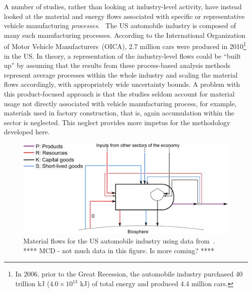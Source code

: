 A number of studies,
rather than looking at industry-level activity,
have instead looked at 
the material and energy flows 
associated with specific or representative vehicle 
manufacturing \emph{processes}.~\cite{Sullivan1998, McCleese2002, Sullivan2010, Hawkins2012, MacLean1998, MacLean2003, Schweimer2000, Burnham2006}
The US automobile industry is composed
of many such manufacturing processes.
According to the International Organization of 
Motor Vehicle Manufacturers~(OICA), 
2.7 million cars were produced in 2010\footnote{In 2006, 
prior to the Great Recession, 
the automobile industry purchased 
40 trillion kJ ($4.0 \times 10^{13}$ kJ) of total energy and 
produced 4.4 million cars.
} 
in the US.\cite{Motor-Vehicle-Manufacturers-OICA:2014aa}
In theory,
a representation of the industry-level flows
could be ``built up'' by assuming that the results from
these process-based analysis methods represent average
processes within the whole industry and 
scaling the material flows accordingly,
with appropriately wide uncertainty bounds.
A problem with this product-focused approach is that
the studies seldom account for material usage not directly
associated with vehicle manufacturing process,
for example, materials used in factory construction,
that is, again accumulation within the sector is neglected.
This neglect provides more impetus for the methodology developed here.


\begin{figure}[!ht]
\centering
\includegraphics[width=\linewidth]{Part_1/Chapter_Materials/images/PERKS_basic_unit_materials_auto_ind.pdf}
\caption[Material flows for the US automobile industry]{Material 
flows for the US automobile industry 
using data from~\cite{Sullivan1998, McCleese2002, Sullivan2010, 
Hawkins2012, MacLean1998, MacLean2003, Schweimer2000, Burnham2006}.
**** MCD - not much data in this figure. Is more coming? ****}
\label{fig:PERKS_materials_auto}
\end{figure}



